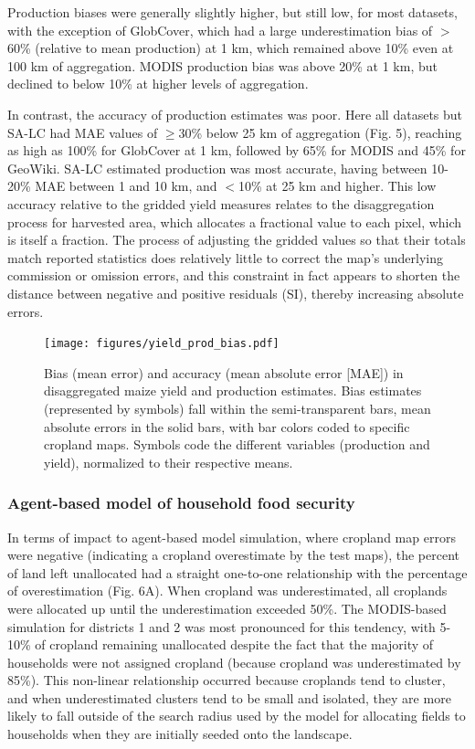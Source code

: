 \documentclass[a4paper]{article}
\begin{document}
Production biases were generally slightly higher, but still low, for most datasets, with the exception of GlobCover, which had a large underestimation bias of $>$60\% (relative to mean production) at 1 km, which remained above 10\% even at 100 km of aggregation. MODIS production bias was above 20\% at 1 km, but declined to below 10\% at higher levels of aggregation.  

In contrast, the accuracy of production estimates was poor. Here all datasets but SA-LC had MAE values of $\geq$30\% below 25 km of aggregation (Fig. 5), reaching as high as 100\% for GlobCover at 1 km, followed by 65\% for MODIS and 45\% for GeoWiki. SA-LC estimated production was most accurate, having between 10-20\% MAE between 1 and 10 km, and $<$10\% at 25 km and higher.  This low accuracy relative to the gridded yield measures relates to the disaggregation process for harvested area, which allocates a fractional value to each pixel, which is itself a fraction. The process of adjusting the gridded values so that their totals match reported statistics does relatively little to correct the map's underlying commission or omission errors, and this constraint in fact appears to shorten the distance between negative and positive residuals (SI), thereby increasing absolute errors.  

\begin{figure}[!ht]
\centerline{\texttt{[image: figures/yield\_prod\_bias.pdf]}}
\caption{Bias (mean error) and accuracy (mean absolute error [MAE]) in disaggregated maize yield and production estimates. Bias estimates (represented by symbols) fall within the semi-transparent bars, mean absolute errors in the solid bars, with bar colors coded to specific cropland maps.  Symbols code the different variables (production and yield), normalized to their respective means.}
\label{afoto}
\end{figure}

\vspace{-0.3 cm}
\subsubsection*{Agent-based model of household food security}
\vspace{-0.2 cm}
In terms of impact to agent-based model simulation, where cropland map errors were negative (indicating a cropland overestimate by the test maps), the percent of land left unallocated had a straight one-to-one relationship with the percentage of overestimation (Fig. 6A). When cropland was underestimated, all croplands were allocated up until the underestimation exceeded 50\%. The MODIS-based simulation for districts 1 and 2 was most pronounced for this tendency, with 5-10\% of cropland remaining unallocated despite the fact that the majority of households were not assigned cropland (because cropland was underestimated by 85\%). This non-linear relationship occurred because croplands tend to cluster, and when underestimated clusters tend to be small and isolated, they are more likely to fall outside of the search radius used by the model for allocating fields to households when they are initially seeded onto the landscape. 
\end{document}
